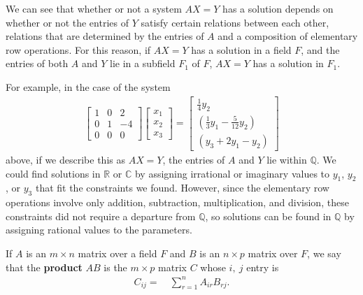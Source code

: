 \documentclass[12pt]{article}
\begin{document}
\begin{comm}
  We can see that whether or not a system $AX = Y$ has a solution
  depends on whether or not the entries of $Y$ satisfy certain
  relations between each other, relations that are determined by
  the entries of $A$ and a composition of elementary row
  operations. For this reason, if $AX = Y$ has a solution in a
  field $F$, and the entries of both $A$ and $Y$ lie in a
  subfield $F_1$ of $F$, $AX = Y$ has a solution in $F_1$.

  For example, in the case of the system
  \begin{align*}
    \begin{bmatrix}
      1 & 0 & 2 \\
      0 & 1 & -4\\
      0 & 0 & 0
    \end{bmatrix}
    \begin{bmatrix}
      x_1\\
      x_2\\
      x_3
    \end{bmatrix}
    =
    \begin{bmatrix}
      \frac{1}{4}y_2\\
      (\frac{1}{3}y_1 - \frac{5}{12}y_2)\\
      (y_3 + 2y_1 - y_2)
    \end{bmatrix}
  \end{align*}
  above, if we describe this as $AX = Y$, the entries of $A$ and
  $Y$ lie within $\mathbb{Q}$. We could find solutions in
  $\mathbb{R}$ or $\mathbb{C}$ by assigning irrational or
  imaginary values to $y_1$, $y_2$, or $y_3$ that fit the
  constraints we found. However, since the elementary row
  operations involve only addition, subtraction, multiplication,
  and division, these constraints did not require a departure
  from $\mathbb{Q}$, so solutions can be found in $\mathbb{Q}$ by
  assigning rational values to the parameters.
\end{comm}

\begin{defn}
  If $A$ is an $m \times n$ matrix over a field $F$ and $B$ is an
  $n \times p$ matrix over $F$, we say that the \textbf{product}
  $AB$ is the $m \times p$ matrix $C$ whose $i,\ j$ entry is
  \begin{align*}
    C_{ij} =&\ \sum_{r = 1}^{n} A_{ir}B_{rj}.
  \end{align*}
\end{defn}
\end{document}
